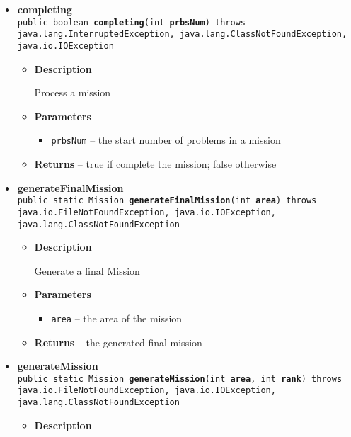 {{{\begin{itemize}
{\begin{itemize}
{Complete a mission
}
\item{
{\bf  Parameters}
  \begin{itemize}
   \item{
\texttt{player} -- the player who completed the mission}
  \end{itemize}
}%
\end{itemize}
}%
\item{ 
{\bf  completing}\\
\texttt{public boolean\ {\bf  completing}(\texttt{int} {\bf  prbsNum}) throws java.lang.InterruptedException, java.lang.ClassNotFoundException, java.io.IOException
\label{personOfInterest.Mission.completing(int)}}%
\begin{itemize}
\item{
{\bf  Description}

Process a mission
}
\item{
{\bf  Parameters}
  \begin{itemize}
   \item{
\texttt{prbsNum} -- the start number of problems in a mission}
  \end{itemize}
}%
\item{{\bf  Returns} -- 
true if complete the mission; false otherwise 
}%
\end{itemize}
}%
\item{ 
{\bf  generateFinalMission}\\
\texttt{public static Mission\ {\bf  generateFinalMission}(\texttt{int} {\bf  area}) throws java.io.FileNotFoundException, java.io.IOException, java.lang.ClassNotFoundException
\label{personOfInterest.Mission.generateFinalMission(int)}}%
\begin{itemize}
\item{
{\bf  Description}

Generate a final Mission
}
\item{
{\bf  Parameters}
  \begin{itemize}
   \item{
\texttt{area} -- the area of the mission}
  \end{itemize}
}%
\item{{\bf  Returns} -- 
the generated final mission 
}%
\end{itemize}
}%
\item{ 
{\bf  generateMission}\\
\texttt{public static Mission\ {\bf  generateMission}(\texttt{int} {\bf  area},
\texttt{int} {\bf  rank}) throws java.io.FileNotFoundException, java.io.IOException, java.lang.ClassNotFoundException
\label{personOfInterest.Mission.generateMission(int, int)}}%
\begin{itemize}
\item{
{\bf  Description}

}
\end{itemize}}
\end{itemize}}}}
